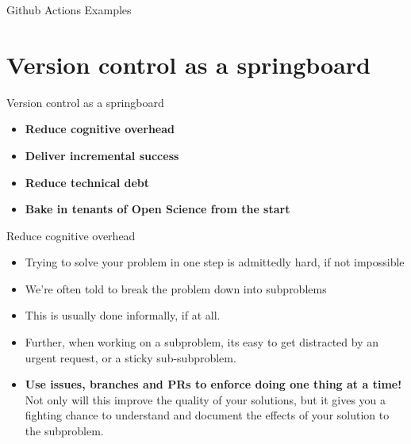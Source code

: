 \documentclass{beamer}
\begin{document}
\begin{frame}{Github Actions Examples}
  
\end{frame}

\section{Version control as a springboard}
\begin{frame}{Version control as a springboard}
  \begin{itemize}
  \item \textbf{Reduce cognitive overhead}
    
  \item \textbf{Deliver incremental success}    

  \item \textbf{Reduce technical debt}
    
  \item \textbf{Bake in tenants of Open Science from the start}

  \end{itemize}
\end{frame}

\begin{frame}{Reduce cognitive overhead}
  \begin{itemize}
  \item Trying to solve your problem in one step is admittedly hard, if not impossible
  \item We're often told to break the problem down into subproblems
  \item This is usually done informally, if at all.
  \item Further, when working on a subproblem, its easy to get distracted by an urgent request, or a sticky sub-subproblem.
  \item \textbf{Use issues, branches and PRs to enforce doing one thing at a time!} Not only will this improve the quality of your solutions, but it gives you a fighting chance to understand and document the effects of your solution to the subproblem.
  \end{itemize}
\end{frame}
\end{document}
